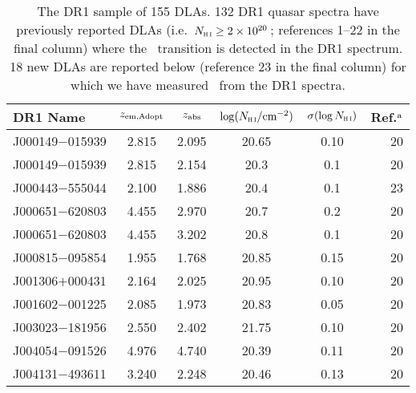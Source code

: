 \begin{table}
  \caption{The DR1 sample of 155 DLAs. 132 DR1 quasar spectra have previously reported DLAs (i.e.\ $N_\textsc{h\scriptsize{\,i}} \ge 2\times10^{20}$\,\pcmsq; references 1--22 in the final column) where the \lya\ transition is detected in the DR1 spectrum. 18 new DLAs are reported below (reference 23 in the final column) for which we have measured \NHI\ from the DR1 spectra.}
\label{t:dla}
\begin{center}
{\footnotesize 
\begin{tabular}{lccccr}
\hline
DR1 Name & $z_{\rm em,Adopt}$ & $z_\textrm{\scriptsize abs}$ & $\log(N_\textsc{h\scriptsize{\,i}}/\textrm{cm}^{-2})$ & $\sigma(\log N_\textsc{h\scriptsize{\,i}})$ & Ref.$^{\rm a}$ \\
\hline
 J000149$-$015939 &      2.815 &                    2.095 &                   20.65 &               0.10 &                20 \\
 J000149$-$015939 &      2.815 &                    2.154 &                   20.3  &               0.1  &                20 \\
 J000443$-$555044 &      2.100 &                    1.886 &                    20.4 &                0.1 &                23 \\
 J000651$-$620803 &      4.455 &                    2.970 &                   20.7  &               0.2  &                20 \\
 J000651$-$620803 &      4.455 &                    3.202 &                   20.8  &               0.1  &                20 \\
 J000815$-$095854 &      1.955 &                    1.768 &                   20.85 &               0.15 &                20 \\
 J001306$+$000431 &      2.164 &                    2.025 &                   20.95 &               0.10 &                20 \\
 J001602$-$001225 &      2.085 &                    1.973 &                   20.83 &               0.05 &                20 \\
 J003023$-$181956 &      2.550 &                    2.402 &                   21.75 &               0.10 &                20 \\
 J004054$-$091526 &      4.976 &                    4.740 &                   20.39 &               0.11 &                20 \\
 J004131$-$493611 &      3.240 &                    2.248 &                   20.46 &               0.13 &                20 \\

\end{tabular}}
\end{center}
\end{table}
